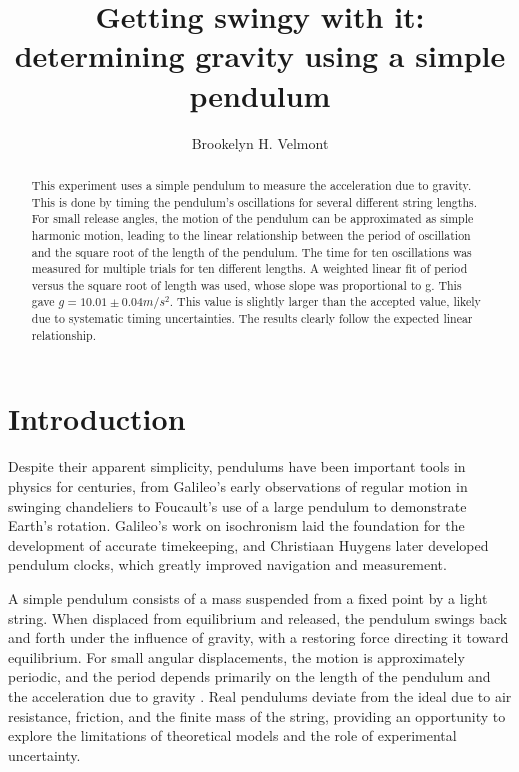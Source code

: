 \documentclass[rc]{physicsinprogress}
\begin{document}
\title{Getting swingy with it: 
determining gravity using a simple pendulum}
\author{Brookelyn H. Velmont}
%
\begin{abstract}
This experiment uses a simple pendulum to measure the acceleration due to gravity. This is done by timing the pendulum's oscillations for several different string lengths. For small release angles, the motion of the pendulum can be approximated as simple harmonic motion, leading to the linear relationship between the period of oscillation and the square root of the length of the pendulum. The time for ten oscillations was measured for multiple trials for ten different lengths. A weighted linear fit of period versus the square root of length was used, whose slope was proportional to g. This gave $g=10.01\pm0.04m/s^2$. This value is slightly larger than the accepted value, likely due to systematic timing uncertainties. The results clearly follow the expected linear relationship.
\end{abstract}
\maketitle
\section{Introduction}

Despite their apparent simplicity, pendulums have been important tools in physics for centuries, from Galileo’s early observations of regular motion in swinging chandeliers to Foucault’s use of a large pendulum to demonstrate Earth’s rotation. Galileo’s work on isochronism laid the foundation for the development of accurate timekeeping, and Christiaan Huygens later developed pendulum clocks, which greatly improved navigation and measurement.

A simple pendulum consists of a mass suspended from a fixed point by a light string. When displaced from equilibrium and released, the pendulum swings back and forth under the influence of gravity, with a restoring force directing it toward equilibrium. For small angular displacements, the motion is approximately periodic, and the period depends primarily on the length of the pendulum and the acceleration due to gravity \cite{belendez2007exact}. Real pendulums deviate from the ideal due to air resistance, friction, and the finite mass of the string, providing an opportunity to explore the limitations of theoretical models and the role of experimental uncertainty.
\end{document}
